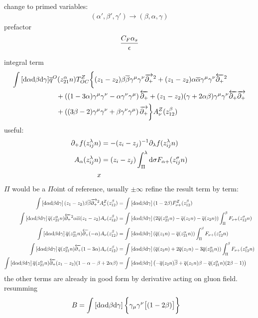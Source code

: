 change to primed variables:
\begin{align}
	(\alpha',\beta',\gamma') \rightarrow (\beta,\alpha,\gamma) 
\end{align}
prefactor
\begin{align}
\frac{ C_F \alpha_s}{\epsilon}
\end{align}

integral term
\begin{align}
\int \left[\text{d} \alpha \text{d} \beta \text{d} \gamma\right] & \overline q^O(z_{21}^{\alpha  }n)T^{Z}_{OC}
\bigg\{ (z_1-z_2)\beta \overline{\beta} \gamma^\mu \gamma^\nu \overrightarrow{\partial_+}^2 
+ (z_1-z_2)\alpha \overline{\alpha} \gamma^\mu \gamma^\nu \overleftarrow{\partial_+}^2 
\\&~~~
+\left((1-3\alpha)\gamma^\mu \gamma^\nu -\alpha \gamma^\nu \gamma^\mu \right)\overleftarrow{\partial_+} 
+ (z_1-z_2)(\gamma +2\alpha\beta)\gamma^\mu \gamma^\nu \overleftarrow{\partial_+} \overrightarrow{\partial_+}
\\&~~~
+\left((3\beta-2)\gamma^\mu \gamma^\nu  + \beta \gamma^\nu \gamma^\mu \right)\overrightarrow{\partial_+}
\bigg\}A^Z_\nu (z_{12}^{\beta}) 
\end{align}
useful:
\begin{align}
	\partial_+ f(z_{ij}^\lambda n) &= -(z_i-z_j)^{-1}\partial_\lambda f(z_{ij}^\lambda n)
	\\
	A_\alpha(z_{ij}^\lambda n) &= (z_i-z_j)\int_\Pi^\lambda \text{d} \sigma F_{\alpha +}(z_{ij}^\sigma n)
	\\
	x
\end{align}
$\Pi$ would be a $\Pi$oint of reference, usually $\pm \infty$
refine the result term by term:
\begin{align}
	\int \left[\text{d} \alpha \text{d} \beta \text{d} \gamma\right] (z_1-z_2)\beta \overline{\beta} \overrightarrow{\partial_+}^2 A^Z_\nu (z_{12}^{\beta}) 
	&=
	\int \left[\text{d} \alpha \text{d} \beta \text{d} \gamma\right] (1-2\beta) F^Z_{\nu+ } (z_{12}^{\beta})
	\\
	\int\left[\text{d} \alpha \text{d} \beta \text{d} \gamma\right] \overline q(z_{21}^\alpha n) \overleftarrow{\partial_+}^2 \alpha \overline{\alpha}(z_1-z_2)A_\nu(z_{12}^\beta)
	&=
	\int\left[\text{d} \alpha \text{d} \beta \text{d} \gamma\right]  \left( 2\overline q(z_{21}^\alpha n) - \overline q(z_1n) -\overline q(z_2n) \right) \int_\Pi^\beta  F_{\nu+} (z_{12}^\sigma n)
	\\
	\int\left[\text{d} \alpha \text{d} \beta \text{d} \gamma\right] \overline q(z_{21}^\alpha n) \overleftarrow{\partial_+} (-\alpha) A_\nu(z_{12}^\beta)
	&=
	\int\left[\text{d} \alpha \text{d} \beta \text{d} \gamma\right]  \left(\overline q(z_1n) - \overline q(z_{21}^\alpha n)  \right) \int_\Pi^\beta  F_{\nu+} (z_{12}^\sigma n)
	\\
	\int\left[\text{d} \alpha \text{d} \beta \text{d} \gamma\right] \overline q(z_{21}^\alpha n) \overleftarrow{\partial_+} (1-3\alpha) A_\nu(z_{12}^\beta)
	&=
	\int\left[\text{d} \alpha \text{d} \beta \text{d} \gamma\right]  \left(\overline q(z_2n)+2\overline q(z_1n) - 3 \overline q(z_{21}^\alpha n)  \right) \int_\Pi^\beta  F_{\nu+} (z_{12}^\sigma n)
	\\
	\int\left[\text{d} \alpha \text{d} \beta \text{d} \gamma\right] \overline q(z_{21}^\alpha n) \overleftarrow{\partial_+} (z_1-z_2) (1-\alpha-\beta +2 \alpha\beta)
	&=
	\int\left[\text{d} \alpha \text{d} \beta \text{d} \gamma\right]  \left(-\overline q(z_2n)\overline{\beta}+ \overline q(z_1n) \beta  - \overline q(z_{21}^\alpha n)(2\beta-1)  \right)
\end{align}
the other terms are already in good form by derivative acting on gluon field.
resumming
\begin{align}
	B&= \int \left[\text{d} \alpha \text{d} \beta \text{d} \gamma\right] \bigg\{ \gamma_\mu \gamma^\nu \big[
	(1-2\beta)
	\big] \bigg\}
\end{align}

